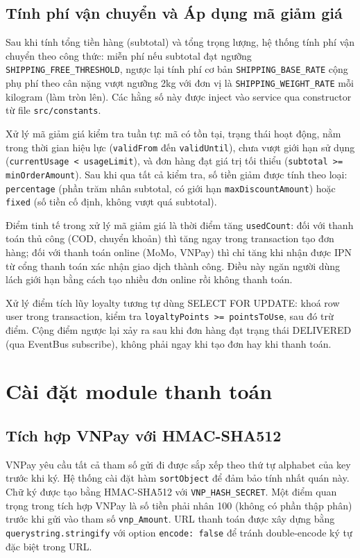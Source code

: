 \subsection{Tính phí vận chuyển và Áp dụng mã giảm giá}

Sau khi tính tổng tiền hàng (subtotal) và tổng trọng lượng, hệ thống tính phí vận chuyển theo công thức: miễn phí nếu subtotal đạt ngưỡng \texttt{SHIPPING\_FREE\_THRESHOLD}, ngược lại tính phí cơ bản \texttt{SHIPPING\_BASE\_RATE} cộng phụ phí theo cân nặng vượt ngưỡng 2kg với đơn vị là \texttt{SHIPPING\_WEIGHT\_RATE} mỗi kilogram (làm tròn lên). Các hằng số này được inject vào service qua constructor từ file \texttt{src/constants}.

Xử lý mã giảm giá kiểm tra tuần tự: mã có tồn tại, trạng thái hoạt động, nằm trong thời gian hiệu lực (\texttt{validFrom} đến \texttt{validUntil}), chưa vượt giới hạn sử dụng (\texttt{currentUsage < usageLimit}), và đơn hàng đạt giá trị tối thiểu (\texttt{subtotal >= minOrderAmount}). Sau khi qua tất cả kiểm tra, số tiền giảm được tính theo loại: \texttt{percentage} (phần trăm nhân subtotal, có giới hạn \texttt{maxDiscountAmount}) hoặc \texttt{fixed} (số tiền cố định, không vượt quá subtotal).

Điểm tinh tế trong xử lý mã giảm giá là thời điểm tăng \texttt{usedCount}: đối với thanh toán thủ công (COD, chuyển khoản) thì tăng ngay trong transaction tạo đơn hàng; đối với thanh toán online (MoMo, VNPay) thì chỉ tăng khi nhận được IPN từ cổng thanh toán xác nhận giao dịch thành công. Điều này ngăn người dùng lách giới hạn bằng cách tạo nhiều đơn online rồi không thanh toán.

Xử lý điểm tích lũy loyalty tương tự dùng SELECT FOR UPDATE: khoá row user trong transaction, kiểm tra \texttt{loyaltyPoints >= pointsToUse}, sau đó trừ điểm. Cộng điểm ngược lại xảy ra sau khi đơn hàng đạt trạng thái DELIVERED (qua EventBus subscribe), không phải ngay khi tạo đơn hay khi thanh toán.

\section{Cài đặt module thanh toán}

\subsection{Tích hợp VNPay với HMAC-SHA512}

VNPay yêu cầu tất cả tham số gửi đi được sắp xếp theo thứ tự alphabet của key trước khi ký. Hệ thống cài đặt hàm \texttt{sortObject} để đảm bảo tính nhất quán này. Chữ ký được tạo bằng HMAC-SHA512 với \texttt{VNP\_HASH\_SECRET}. Một điểm quan trọng trong tích hợp VNPay là số tiền phải nhân 100 (không có phần thập phân) trước khi gửi vào tham số \texttt{vnp\_Amount}. URL thanh toán được xây dựng bằng \texttt{querystring.stringify} với option \texttt{encode: false} để tránh double-encode ký tự đặc biệt trong URL.

